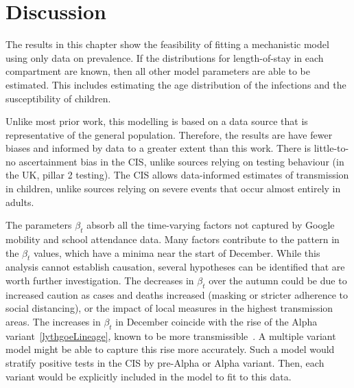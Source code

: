 \documentclass[thesis.tex]{subfiles}
\begin{document}

\section{Discussion} \label{SEIR:sec:discussion}

The results in this chapter show the feasibility of fitting a mechanistic model using only data on prevalence.
If the distributions for length-of-stay in each compartment are known, then all other model parameters are able to be estimated.
This includes estimating the age distribution of the infections and the susceptibility of children.

Unlike most prior work, this modelling is based on a data source that is representative of the general population.
Therefore, the results are have fewer biases and informed by data to a greater extent than this work.
There is little-to-no ascertainment bias in the CIS, unlike sources relying on testing behaviour (in the UK, pillar 2 testing).
The CIS allows data-informed estimates of transmission in children, unlike sources relying on severe events that occur almost entirely in adults.

The parameters $\beta_t$ absorb all the time-varying factors not captured by Google mobility and school attendance data.
Many factors contribute to the pattern in the $\beta_t$ values, which have a minima near the start of December.
While this analysis cannot establish causation, several hypotheses can be identified that are worth further investigation.
The decreases in $\beta_t$ over the autumn could be due to increased caution as cases and deaths increased (\eg masking or stricter adherence to social distancing), or the impact of local measures in the highest transmission areas.
The increases in $\beta_t$ in December coincide with the rise of the Alpha variant~\autoref{lythgoeLineage}, known to be more transmissible~.
A multiple variant model might be able to capture this rise more accurately.
Such a model would stratify positive tests in the CIS by pre-Alpha or Alpha variant.
Then, each variant would be explicitly included in the model to fit to this data.
\end{document}
